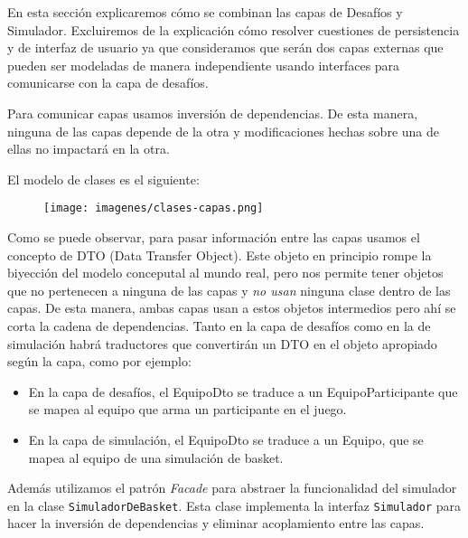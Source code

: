 En esta sección explicaremos cómo se combinan las capas de Desafíos y Simulador. Excluiremos de la explicación cómo resolver cuestiones de persistencia
y de interfaz de usuario ya que consideramos que serán dos capas externas que pueden ser modeladas de manera independiente usando interfaces para
comunicarse con la capa de desafíos.

Para comunicar capas usamos inversión de dependencias. De esta manera, ninguna de las capas depende de la otra y modificaciones hechas sobre una de ellas
no impactará en la otra.

El modelo de clases es el siguiente:

\newpage
\begin{landscape}

  \begin{figure}[h!]
   \texttt{[image: imagenes/clases-capas.png]}
   \caption{}
  \end{figure}

\end{landscape}
\newpage

Como se puede observar, para pasar información entre las capas usamos el concepto de DTO (Data Transfer Object). Este objeto en principio rompe la
biyección del modelo conceputal al mundo real, pero nos permite tener objetos que no pertenecen a ninguna de las capas y \emph{no usan} ninguna clase
dentro de las capas. De esta manera, ambas capas usan a estos objetos intermedios pero ahí se corta la cadena de dependencias. Tanto en la capa de desafíos
como en la de simulación habrá traductores que convertirán un DTO en el objeto apropiado según la capa, como por ejemplo:
\begin{itemize}
 \item En la capa de desafíos, el EquipoDto se traduce a un EquipoParticipante que se mapea al equipo que arma un participante en el juego.
 \item En la capa de simulación, el EquipoDto se traduce a un Equipo, que se mapea al equipo de una simulación de basket.
\end{itemize}

Además utilizamos el patrón \emph{Facade} para abstraer la funcionalidad del simulador en la clase {\tt SimuladorDeBasket}. Esta clase implementa
la interfaz {\tt Simulador} para hacer la inversión de dependencias y eliminar acoplamiento entre las capas.